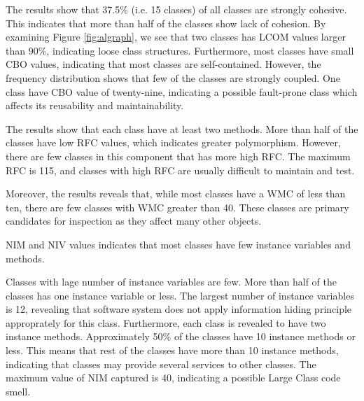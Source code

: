 The results show that 37.5\% (i.e. 15 classes) of all classes are strongly cohesive. This indicates that more than half of the classes show lack of cohesion. By examining Figure \ref{fig:algraph}, we see that two classes has LCOM values larger than 90\%, indicating loose class structures. Furthermore, most classes have small CBO values, indicating that most classes are self-contained. However, the frequency distribution shows that few of the classes are strongly coupled. One class have CBO value of twenty-nine, indicating a possible fault-prone class which affects its reusability and maintainability. 

The results show that each class have at least two methods. More than half of the classes have low RFC values, which indicates greater polymorphism. However, there are few classes in this component that has more high RFC. The maximum RFC is 115, and classes with high RFC are usually difficult to maintain and test. 

Moreover, the results reveals that, while most classes have a WMC of less than ten, there are few classes with WMC greater than 40. These classes are primary candidates for inspection as they affect many other objects. 

NIM and NIV values indicates that most classes have few instance variables and methods. 

Classes with lage number of instance variables are few. More than half of the classes has one instance variable or less. The largest number of instance variables is 12, revealing that software system does not apply information hiding principle approprately for this class. Furthermore, each class is revealed to have two instance methods. Approximately 50\% of the classes have 10 instance methods or less. This means that rest of the classes have more than 10 instance methods, indicating that classes may provide several services to other classes. The maximum value of NIM captured is 40, indicating a possible Large Class code smell. 

